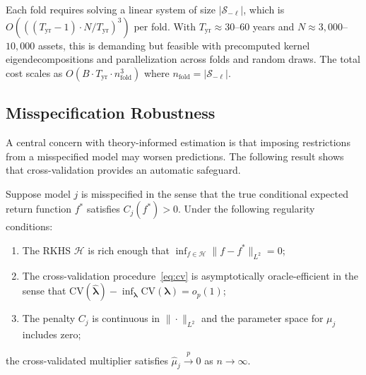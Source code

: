 \begin{remark}
\label{rem:cv_computation}
Each fold requires solving a linear system of size $|\mathcal{S}_{-\ell}|$,
which is $O(((T_{\mathrm{yr}}-1) \cdot N / T_{\mathrm{yr}})^3)$ per fold.
With $T_{\mathrm{yr}} \approx 30$--$60$ years and $N \approx 3{,}000$--$10{,}000$
assets, this is demanding but feasible with precomputed kernel
eigendecompositions and parallelization across folds and random draws.
The total cost scales as $O(B \cdot T_{\mathrm{yr}} \cdot n_{\mathrm{fold}}^3)$
where $n_{\mathrm{fold}} = |\mathcal{S}_{-\ell}|$.
\end{remark}

\subsection{Misspecification Robustness}
\label{sub:misspecification}

A central concern with theory-informed estimation is that imposing
restrictions from a misspecified model may worsen predictions.
The following result shows that cross-validation provides an automatic
safeguard.

\begin{proposition}
\label{prop:misspecification}
Suppose model $j$ is misspecified in the sense that the true
conditional expected return function $f^*$ satisfies
$C_j(f^*) > 0$.
Under the following regularity conditions:
\begin{enumerate}[label=\textnormal{(R\arabic*)}]
\item \label{cond:consistency}
  The RKHS $\mathcal{H}$ is rich enough that
  $\inf_{f \in \mathcal{H}} \|f - f^*\|_{L^2} = 0$;
\item \label{cond:cv_oracle}
  The cross-validation procedure~\eqref{eq:cv} is asymptotically
  oracle-efficient in the sense that
  $\mathrm{CV}(\hat{\boldsymbol{\lambda}}) - \inf_{\boldsymbol{\lambda}}
  \mathrm{CV}(\boldsymbol{\lambda}) = o_p(1)$;
\item \label{cond:bounded}
  The penalty $C_j$ is continuous in $\|\cdot\|_{L^2}$ and the
  parameter space for $\mu_j$ includes zero;
\end{enumerate}
the cross-validated multiplier satisfies
$\hat{\mu}_j \xrightarrow{p} 0$ as $n \to \infty$.
\end{proposition}

